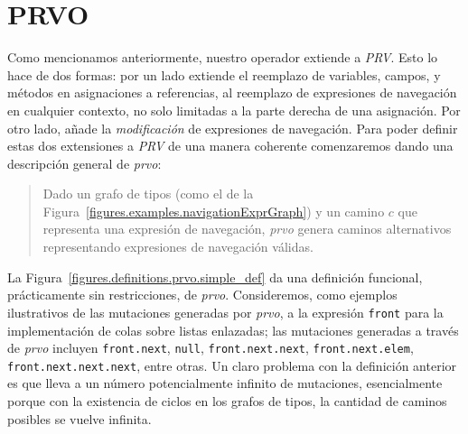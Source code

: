 \section{PRVO}
\label{sec:prvo.prvo}

Como mencionamos anteriormente, nuestro operador extiende a \emph{PRV}. Esto lo hace de dos formas: por un lado extiende el reemplazo de variables, campos, y m\'etodos en asignaciones a referencias, al reemplazo de expresiones de navegaci\'on en cualquier contexto, no solo limitadas a la parte derecha de una asignaci\'on. Por otro lado, a\~nade la \emph{modificaci\'on} de expresiones de navegaci\'on. Para poder definir estas dos extensiones a \emph{PRV} de una manera coherente comenzaremos dando una descripci\'on general de \emph{prvo}:

\begin{quote}
	Dado un grafo de tipos (como el de la Figura~\ref{figures.examples.navigationExprGraph}) y un camino $c$ que representa una expresi\'on de navegaci\'on, \emph{prvo} genera caminos alternativos representando expresiones de navegaci\'on v\'alidas.
\end{quote}
La Figura~\ref{figures.definitions.prvo.simple_def} da una definici\'on funcional, pr\'acticamente sin restricciones, de \emph{prvo}. Consideremos, como ejemplos ilustrativos de las mutaciones generadas por \emph{prvo}, a la expresi\'on \texttt{front} para la implementaci\'on de colas sobre listas enlazadas; las mutaciones generadas a trav\'es de \emph{prvo} incluyen \texttt{front.next}, \texttt{null}, \texttt{front.next.next}, \texttt{front.next.elem}, \texttt{front.next.next.next}, entre otras. Un claro problema con la definici\'on anterior es que lleva a un n\'umero potencialmente infinito de mutaciones, esencialmente porque con la existencia de ciclos en los grafos de tipos, la cantidad de caminos posibles se vuelve infinita.

